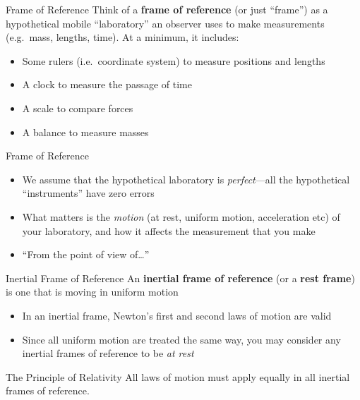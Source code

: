 \documentclass[12pt,compress,aspectratio=169]{beamer}
\begin{document}
\begin{frame}{Frame of Reference}
  Think of a \textbf{frame of reference} (or just ``frame'') as a hypothetical
  mobile ``laboratory'' an observer uses to make measurements (e.g.\ mass,
  lengths, time). At a minimum, it includes:
  \begin{itemize}
  \item Some rulers (i.e.\ coordinate system) to measure positions and lengths
  \item A clock to measure the passage of time
  \item A scale to compare forces
  \item A balance to measure masses
  \end{itemize}
\end{frame}



\begin{frame}{Frame of Reference}
  \begin{itemize}
  \item We assume that the hypothetical laboratory is \emph{perfect}---all the
    hypothetical ``instruments'' have zero errors
  \item What matters is the \emph{motion} (at rest, uniform motion, acceleration
    etc) of your laboratory, and how it affects the measurement that you make
  \item ``From the point of view of\ldots''
  \end{itemize}
\end{frame}



\begin{frame}{Inertial Frame of Reference}
  An \textbf{inertial frame of reference} (or a \textbf{rest frame}) is one
  that is moving in uniform motion
  \begin{itemize}
  \item In an inertial frame, Newton's first and second laws of motion are valid
  \item Since all uniform motion are treated the same way, you may consider
    any inertial frames of reference to be \emph{at rest}
  \end{itemize}
  \vspace{.2in}
  \begin{block}{The Principle of Relativity}
    All laws of motion must apply equally in all inertial frames of reference.
  \end{block}
\end{frame}
\end{document}

